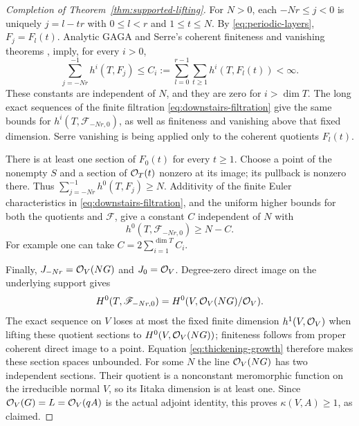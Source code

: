 \begin{proof}[Completion of Theorem~\ref{thm:supported-lifting}]
For \(N>0\), each \(-Nr\leq j<0\) is uniquely \(j=l-tr\) with
\(0\leq l<r\) and \(1\leq t\leq N\).  By
\eqref{eq:periodic-layers}, \(F_j=F_l(t)\).  Analytic GAGA and Serre's
coherent finiteness and vanishing theorems
\cite[Section~3, no.~12, Theorems~1 and~3]{Serre1956GAGA},
\cite[Section~66, Theorems~1 and~2]{Serre1955FAC} imply, for every
\(i>0\),
\begin{equation}\label{eq:higher-layer-bound}
 \sum_{j=-Nr}^{-1}h^i(T,F_j)
 \leq C_i:=\sum_{l=0}^{r-1}\sum_{t\geq1}h^i(T,F_l(t))<\infty.
\end{equation}
These constants are independent of \(N\), and they are zero for
\(i>\dim T\).  The long exact sequences of the finite filtration
\eqref{eq:downstairs-filtration} give the same bounds for
\(h^i(T,\mathscr F_{-Nr,0})\), as well as finiteness and vanishing above
that fixed dimension.  Serre vanishing is being applied only to the
coherent quotients \(F_l(t)\).

There is at least one section of \(F_0(t)\) for every \(t\geq1\).
Choose a point of the nonempty \(S\) and a section of \(\mathcal O_T(t)\)
nonzero at its image; its pullback is nonzero there.  Thus
\(\sum_{j=-Nr}^{-1}h^0(T,F_j)\geq N\).  Additivity of the finite Euler
characteristics in \eqref{eq:downstairs-filtration}, and the uniform
higher bounds for both the quotients and \(\mathscr F\), give a constant
\(C\) independent of \(N\) with
\begin{equation}\label{eq:thickening-growth}
 h^0(T,\mathscr F_{-Nr,0})\geq N-C.
\end{equation}
For example one can take \(C=2\sum_{i=1}^{\dim T}C_i\).

Finally, \(J_{-Nr}=\mathcal O_V(NG)\) and \(J_0=\mathcal O_V\).  Degree-zero direct
image on the underlying support gives
\[
 H^0(T,\mathscr F_{-Nr,0})=
 H^0(V,\mathcal O_V(NG)/\mathcal O_V).
\]
The exact sequence on \(V\) loses at most the fixed finite dimension
\(h^1(V,\mathcal O_V)\) when lifting these quotient sections to
\(H^0(V,\mathcal O_V(NG))\); finiteness follows from proper coherent direct
image to a point.  Equation \eqref{eq:thickening-growth} therefore makes
these section spaces unbounded.  For some \(N\) the line \(\mathcal O_V(NG)\)
has two independent sections.  Their quotient is a nonconstant meromorphic
function on the irreducible normal \(V\), so its Iitaka dimension is at
least one.  Since \(\mathcal O_V(G)=L=\mathcal O_V(qA)\) is the actual adjoint
identity, this proves \(\kappa(V,A)\geq1\), as claimed.
\end{proof}
